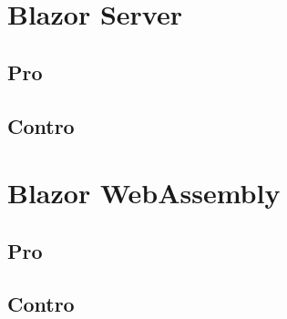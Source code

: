 \section{Blazor Server}\label{sez:scalabilitaBServer}

\subsection{Pro}\label{sez:proBServer}

\subsection{Contro}\label{sez:controBServer}


\section{Blazor WebAssembly}\label{sez:scalabilitaBWA}

\subsection{Pro}\label{sez:proBWA}


\subsection{Contro}\label{sez:controBWA}